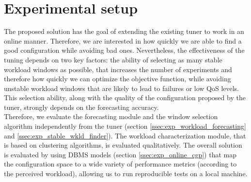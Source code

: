 \documentclass[a4paper, 12pt]{article} %
\begin{document}
	\section{ Experimental setup } \label{sec:exp_setup}
	The proposed solution has the goal of extending the existing tuner \cite{AkamasCGP} to work in an online manner. Therefore, we are interested in how quickly we are able to find a good configuration while avoiding bad ones. Nevertheless, the effectiveness of the tuning depends on two key factors: the ability of selecting as many stable workload windows as possible, that increases the number of experiments and therefore how quickly we can optimize the objective function, while avoiding unstable workload windows that are likely to lead to failures or low QoS levels. This selection ability,  along with the quality of the configuration proposed by the tuner, strongly depends on the forecasting accuracy.\\
	Therefore, we evaluate the forecasting module and the window selection algorithm independently from the tuner (section \ref{ssec:exp_workload_forecasting} and \ref{ssec:exp_stable_wkld_finder}). The workload characterization module, that is based on clustering algorithms, is evaluated qualitatively. The overall solution is evaluated by using DBMS models (section \ref{ssec:exp_online_cgp}) that map the configuration space to a wide variety of performance metrics (according to the perceived workload), allowing us to run reproducible tests on a local machine.
	
\end{document}
